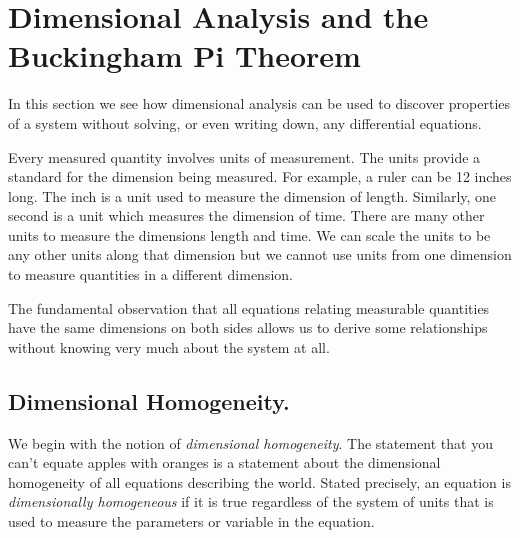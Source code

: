 
\section{Dimensional Analysis and the Buckingham Pi Theorem}

In this section we see how dimensional analysis can be
used to discover properties of a system
without solving, or even  writing down,
any differential equations.

Every measured quantity involves units of measurement.
The units provide a standard for the dimension being measured.
For example, a ruler can be 12 inches long.  The inch is a unit used
to measure the dimension of length.  Similarly, one second is a
unit which measures the dimension of time.  There are many other
units to measure the dimensions length and time.  We can
scale the units to be any other units along that dimension but we cannot use
units from one dimension to measure quantities in a different dimension.

The fundamental observation that all equations 
relating measurable quantities have the same dimensions on both sides 
allows us to derive some relationships without knowing very much about 
the system at all.

\subsection{Dimensional Homogeneity.}
We begin with the notion of \emph{dimensional
homogeneity}.
The statement that you can't equate apples with oranges is a statement 
about the dimensional homogeneity of all equations describing the world.
Stated precisely,
an equation is \emph{dimensionally homogeneous}
if it is true regardless of the system
of units that is used to measure the parameters
or variable in the equation.

